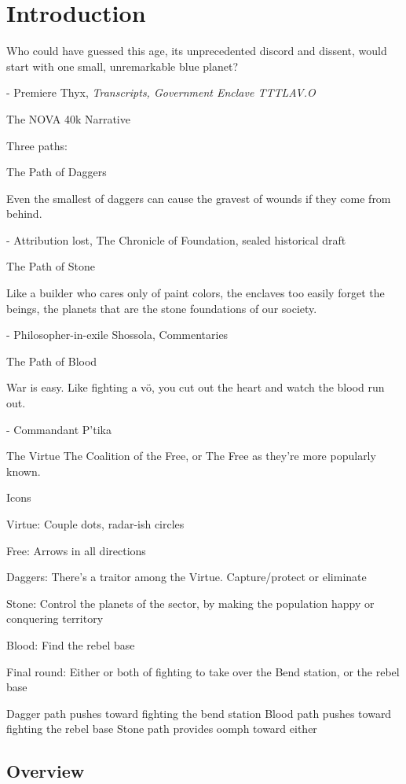 \documentclass{novanarrative}
\begin{document}
\chapter{Introduction}

Who could have guessed this age, its unprecedented discord and
dissent, would start with one small, unremarkable blue planet?

- Premiere Thyx, \textit{Transcripts, Government Enclave TTTLAV.O}




The NOVA 40k Narrative


Three paths:

The Path of Daggers

Even the smallest of daggers can cause the gravest of wounds if they
come from behind.

- Attribution lost, The Chronicle of Foundation, sealed historical draft


The Path of Stone

Like a builder who cares only of paint colors, the enclaves too easily
forget the beings, the planets that are the stone foundations of our
society.

- Philosopher-in-exile Shossola, Commentaries


The Path of Blood

War is easy.  Like fighting a v\"o, you cut out the heart and watch
the blood run out.

- Commandant P'tika





The Virtue
The Coalition of the Free, or The Free as they're more popularly known.

Icons

Virtue: Couple dots, radar-ish circles

Free: Arrows in all directions


Daggers: There's a traitor among the Virtue.  Capture/protect or eliminate

Stone: Control the planets of the sector, by making the population happy or
conquering territory

Blood: Find the rebel base


Final round: Either or both of fighting to take over the Bend station,
or the rebel base

Dagger path pushes toward fighting the bend station
Blood path pushes toward fighting the rebel base
Stone path provides oomph toward either

\section{Overview}
\end{document}
